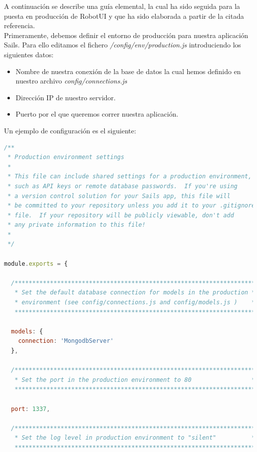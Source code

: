 \begin{appendix}
A continuación se describe una guía elemental, la cual ha sido seguida para la puesta en producción de RobotUI y que ha sido elaborada a partir de la citada referencia.\\

Primeramente, debemos definir el entorno de producción para nuestra aplicación Sails. Para ello editamos el fichero \emph{/config/env/production.js} introduciendo los siguientes datos:\\

\begin{itemize}
 \item Nombre de nuestra conexión de la base de datos la cual hemos definido en nuestro archivo \emph{config/connections.js}
 \item Dirección IP de nuestro servidor.
 \item Puerto por el que queremos correr nuestra aplicación.
\end{itemize}
  
Un ejemplo de configuración es el siguiente:

\begin{lstlisting}[language=JavaScript]
/**
 * Production environment settings
 *
 * This file can include shared settings for a production environment,
 * such as API keys or remote database passwords.  If you're using
 * a version control solution for your Sails app, this file will
 * be committed to your repository unless you add it to your .gitignore
 * file.  If your repository will be publicly viewable, don't add
 * any private information to this file!
 *
 */

module.exports = {

  /********************************************************************
   * Set the default database connection for models in the production *
   * environment (see config/connections.js and config/models.js )    *
   ********************************************************************/

  models: {
    connection: 'MongodbServer'
  },

  /********************************************************************
   * Set the port in the production environment to 80                 *
   ********************************************************************/

  port: 1337,

  /********************************************************************
   * Set the log level in production environment to "silent"          *
   ********************************************************************/


\end{lstlisting}
\end{appendix}
